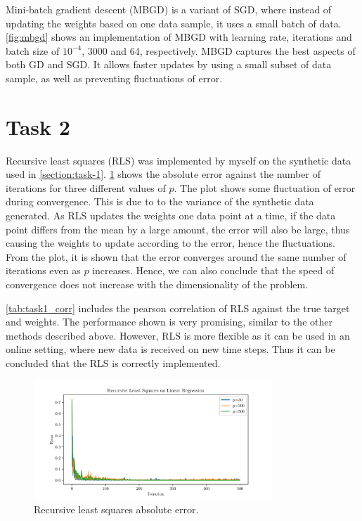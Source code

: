 \documentclass{article}
\begin{document}
Mini-batch gradient descent (MBGD) is a variant of SGD, where instead of updating the weights based on one data sample, it uses a small batch of data. \cref{fig:mbgd} shows an implementation of MBGD with learning rate, iterations and batch size of $10^{-4}$, 3000 and 64, respectively. MBGD captures the best aspects of both GD and SGD. It allows faster updates by using a small subset of data sample, as well as preventing fluctuations of error.


\section{Task 2}

Recursive least squares (RLS) was implemented by myself on the synthetic data used in \cref{section:task-1}. \cref{fig:rls} shows the absolute error against the number of iterations for three different values of $p$. The plot shows some fluctuation of error during convergence. This is due to to the variance of the synthetic data generated. As RLS updates the weights one data point at a time, if the data point differs from the mean by a large amount, the error will also be large, thus causing the weights to update according to the error, hence the fluctuations. From the plot, it is shown that the error converges around the same number of iterations even as $p$ increases. Hence, we can also conclude that the speed of convergence does not increase with the dimensionality of the problem.

\cref{tab:task1_corr} includes the pearson correlation of RLS against the true target and weights. The performance shown is very promising, similar to the other methods described above. However, RLS is more flexible as it can be used in an online setting, where new data is received on new time steps. Thus it can be concluded that the RLS is correctly implemented.

\begin{figure}[h!]
    \centering
    \includegraphics[width=0.8\textwidth]{Figures/rls_iterError.pdf}
    \caption{Recursive least squares absolute error.}
    \label{fig:rls}
\end{figure}
\end{document}
